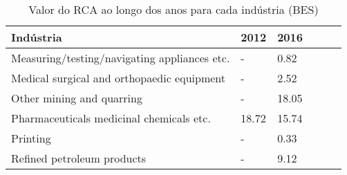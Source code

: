 \begin{table}
\centering
\caption{Valor do RCA ao longo dos anos para cada indústria (BES)}
\label{tab:ex3-tempo-BES}
\begin{tabular}{p{6cm}p{1.5cm}p{1.5cm}p{1.5cm}p{1.5cm}p{1.5cm}}
\toprule
                                   Indústria &  2012 &  2016 \\
\midrule
Measuring/testing/navigating appliances etc. &     - &  0.82 \\
  Medical surgical and orthopaedic equipment &     - &  2.52 \\
                   Other mining and quarring &     - & 18.05 \\
    Pharmaceuticals medicinal chemicals etc. & 18.72 & 15.74 \\
                                    Printing &     - &  0.33 \\
                  Refined petroleum products &     - &  9.12 \\
\bottomrule
\end{tabular}
\end{table}

